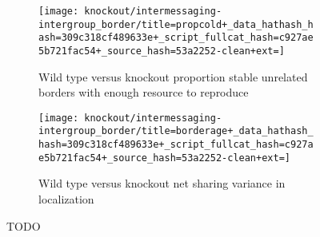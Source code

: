 \begin{figure*}[!htbp]
\begin{center}
\begin{minipage}[t]{\columnwidth}
\hspace*{\fill}%
\begin{minipage}[t]{\columnwidth}
\centering
\vspace{0pt} %
\begin{subfigure}[b]{\textwidth}
\texttt{[image: knockout/intermessaging-intergroup\_border/title=propcold+\_data\_hathash\_hash=309c318cf489633e+\_script\_fullcat\_hash=c927ae5b721fac54+\_source\_hash=53a2252-clean+ext=]}%
\caption{Wild type versus knockout proportion stable unrelated borders with enough resource to reproduce}
\label{fig:TODO}
\end{subfigure}
\end{minipage}%
\hspace*{\fill}

\hspace*{\fill}%
\begin{minipage}[t]{\columnwidth}
\centering
\vspace{0pt} %
\begin{subfigure}[b]{\textwidth}
\texttt{[image: knockout/intermessaging-intergroup\_border/title=borderage+\_data\_hathash\_hash=309c318cf489633e+\_script\_fullcat\_hash=c927ae5b721fac54+\_source\_hash=53a2252-clean+ext=]}%
\caption{Wild type versus knockout net sharing variance in localization}
\label{fig:TODO}
\end{subfigure}
\end{minipage}%
\hspace*{\fill}
\end{minipage}

\caption{
TODO
}
\label{fig:ko-apoptosis}
\end{center}
\end{figure*}
